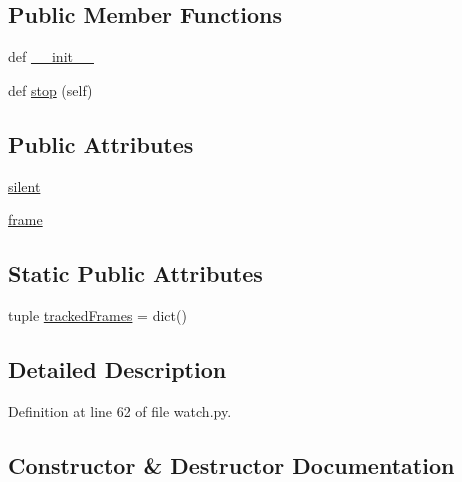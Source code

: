 \subsection*{Public Member Functions}
\begin{DoxyCompactItemize}
\item 
def \hyperlink{classmemoryoracle_1_1watch_1_1StateCatch_a38b410cc8c4e5fae056c4e7e87e2b947}{\+\_\+\+\_\+init\+\_\+\+\_\+}
\item 
def \hyperlink{classmemoryoracle_1_1watch_1_1StateCatch_ab0da6fca924dccf11ac2c4da2620f211}{stop} (self)
\end{DoxyCompactItemize}
\subsection*{Public Attributes}
\begin{DoxyCompactItemize}
\item 
\hyperlink{classmemoryoracle_1_1watch_1_1StateCatch_aa6aa955a60ded1f2db63e6e6b37d5027}{silent}
\item 
\hyperlink{classmemoryoracle_1_1watch_1_1StateCatch_aa2e2ebcdb40ead7d1114f09d20181e18}{frame}
\end{DoxyCompactItemize}
\subsection*{Static Public Attributes}
\begin{DoxyCompactItemize}
\item 
tuple \hyperlink{classmemoryoracle_1_1watch_1_1StateCatch_ac14780996a90f60b06a022254645a332}{tracked\+Frames} = dict()
\end{DoxyCompactItemize}


\subsection{Detailed Description}


Definition at line 62 of file watch.\+py.



\subsection{Constructor \& Destructor Documentation}
\hypertarget{classmemoryoracle_1_1watch_1_1StateCatch_a38b410cc8c4e5fae056c4e7e87e2b947}{}
